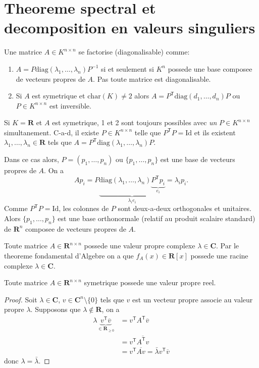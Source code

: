 \chapter{Theoreme spectral et decomposition en valeurs singuliers}

Une matrice $A\in K^{n\times n}$ se factorise (diagonalisable) comme: 
\begin{enumerate}
\item $A=P\mathrm{diag}(\lambda_{1},\dots,\lambda _{n})P^{-1}$ si et seulement si $K^{n}$ possede une base composee de vecteurs propres de $A$. Pas toute matrice est diagonalisable.
\item Si $A$ est symetrique et $\mathrm{char}(K)\neq 2$ alors $A=P^{\mathsf{T}}\mathrm{diag}(d_{1},\dots,d_{n})P$ ou $P\in K^{n\times n}$ est inversible.
\end{enumerate}

Si $K=\mathbf{R}$ et $A$ est symetrique, 1 et 2 sont toujours possibles avec \emph{un} $P\in K^{n\times n}$ simultanement. C-a-d, il existe $P\in K^{n\times n}$ telle que $P^{\mathsf{T}}P=\mathrm{Id}$ et ils existent $\lambda_{1},\dots,\lambda _{n}\in \mathbf{R}$ tels que $A=P^{\mathsf{T}}\mathrm{diag}(\lambda_{1},\dots,\lambda _{n})P$. 

Dans ce cas alors, $P=(p_{1},\dots,p_{n})$ ou $\{p_{1},\dots,p_{n}\}$ est une base de vecteurs propres de $A$. On a 
$$
Ap_{i}=P\underbrace{ \mathrm{diag}(\lambda_{1},\dots,\lambda _{n})\underbrace{ P^{\mathsf{T}}p_{i} }_{ e_{i} } }_{ \lambda _{i}e_{i} }=\lambda _{i}p_{i}.
$$
Comme $P^{\mathsf{T}}P=\mathrm{Id}$, les colonnes de $P$ sont deux-a-deux orthogonales et unitaires. Alors $\{ p_{1},\dots,p_{n} \}$ est une base orthonormale (relatif au produit scalaire standard) de $\mathbf{R}^{n}$ composee de vecteurs propres de $A$.

\begin{lemma}
Toute matrice $A\in \mathbf{R}^{n\times n}$ possede une valeur propre complexe $\lambda \in \mathbf{C}$. Par le theoreme fondamental d'Algebre on a que $f_{A}(x)\in \mathbf{R}[x]$ possede une racine complexe $\lambda \in \mathbf{C}$.
\end{lemma}
\begin{proposition}
Toute matrice $A\in \mathbf{R}^{n\times n}$ symetrique possede une valeur propre reel.
\end{proposition}
\begin{proof}
Soit $\lambda \in \mathbf{C}$, $v \in \mathbf{C}^{n}\setminus \{ 0 \}$ tels que $v$ est un vecteur propre associe au valeur propre $\lambda$. Supposons que $\lambda \not\in \mathbf{R}$, on a
\begin{align*}
\lambda \underbrace{ v^{\mathsf{T}} \overline{v} }_{ \in \mathbf{R}_{\ge 0} } & =v^{\mathsf{T}}A^{\mathsf{T}} \overline{v} \\
 & =v^{\mathsf{T}} \overline{A^{\mathsf{T}}v} \\
 & =v^{\mathsf{T}} \overline{Av}=\bar{\lambda} v^{\mathsf{T}}\overline{v}
\end{align*}
donc $\lambda=\bar{\lambda}$.
\end{proof}
